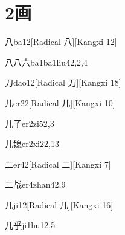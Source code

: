 
\section*{2画}

\begin{verbete}{八}{ba1}{2}[Radical 八][Kangxi 12]
\end{verbete}

\begin{verbete}{八八六}{ba1ba1liu4}{2,2,4}
\end{verbete}

\begin{verbete}{刀}{dao1}{2}[Radical ⼑][Kangxi 18]
\end{verbete}

\begin{verbete}{儿}{er2}{2}[Radical ⼉][Kangxi 10]
\end{verbete}

\begin{verbete}{儿子}{er2zi5}{2,3}
\end{verbete}

\begin{verbete}{儿媳}{er2xi2}{2,13}
\end{verbete}

\begin{verbete}{二}{er4}{2}[Radical ⼆][Kangxi 7]
\end{verbete}

\begin{verbete}{二战}{er4zhan4}{2,9}
\end{verbete}

\begin{verbete}{几}{ji1}{2}[Radical 几][Kangxi 16]
\end{verbete}

\begin{verbete}{几乎}{ji1hu1}{2,5}
\end{verbete}

